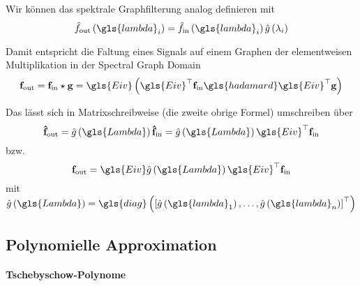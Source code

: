 Wir können das spektrale Graphfilterung analog definieren mit
\begin{equation}
  \hat f_{\mathrm{out}}\left(\gls{lambda}_i\right) = \hat f_{\mathrm{in}}\left(\gls{lambda}_i\right)\hat g\left(\lambda_i\right)
\end{equation}

Damit entspricht die Faltung eines Signals auf einem Graphen der elementweisen Multiplikation in der Spectral Graph Domain
\begin{equation}
  \ve{f}_{\mathrm{out}} = \ve{f}_{\mathrm{in}} \star \ve{g} = \gls{Eiv}\left(\gls{Eiv}^{\top}\ve{f}_{\mathrm{in}} \gls{hadamard} \gls{Eiv}^{\top}\ve{g}\right)
\end{equation}

Das lässt sich in Matrixschreibweise (die zweite obrige Formel) umschreiben über
\begin{equation}
  \ve{\hat f}_{\mathrm{out}} = \hat g\left(\gls{Lambda}\right) \ve{\hat f}_{\mathrm{in}} = \hat g\left(\gls{Lambda}\right)\gls{Eiv}^{\top}\ve{f}_{\mathrm{in}}
\end{equation}
bzw.
\begin{equation}
  \ve{f}_{\mathrm{out}} = \gls{Eiv}\hat g\left(\gls{Lambda}\right)\gls{Eiv}^{\top}\ve{f}_{\mathrm{in}}
\end{equation}
mit $\hat g\left(\gls{Lambda}\right) = \gls{diag}\left({\left[\hat g\left(\gls{lambda}_1\right), \ldots, \hat g\left(\gls{lambda}_n\right)\right]}^{\top}\right)$

\subsection{Polynomielle Approximation}
\label{polynomielle_approximation}

\paragraph{Tschebyschow-Polynome}
\label{tschebyschow_polynome}

